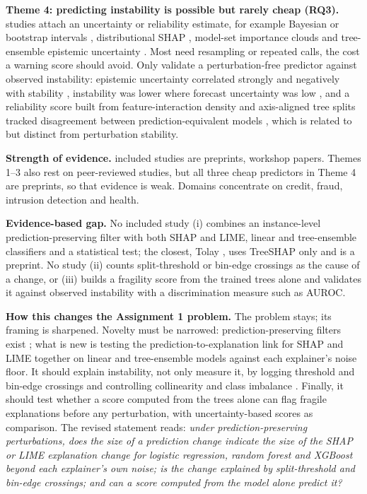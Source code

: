 \textbf{Theme 4: predicting instability is possible but rarely cheap (RQ3).} \mapdiag{} studies attach an uncertainty or reliability estimate, for example Bayesian or bootstrap intervals \cite{S05,S11,S35}, distributional SHAP \cite{S73,S74}, model-set importance clouds \cite{S71} and tree-ensemble epistemic uncertainty \cite{S47}. Most need resampling or repeated calls, the cost a warning score should avoid. Only \mapdiagfree{} validate a perturbation-free predictor against observed instability: epistemic uncertainty correlated strongly and negatively with stability \cite{S52}, instability was lower where forecast uncertainty was low \cite{S77}, and a reliability score built from feature-interaction density and axis-aligned tree splits tracked disagreement between prediction-equivalent models \cite{S75}, which is related to but distinct from perturbation stability.

\textbf{Strength of evidence.} \incPreprint{} included studies are preprints, \incWorkshop{} workshop papers. Themes 1--3 also rest on peer-reviewed studies, but all three cheap predictors in Theme 4 are preprints, so that evidence is weak. Domains concentrate on credit, fraud, intrusion detection and health.

\textbf{Evidence-based gap.} No included study (i) combines an instance-level prediction-preserving filter with both SHAP and LIME, linear and tree-ensemble classifiers and a statistical test; the closest, Tolay \cite{S62}, uses TreeSHAP only and is a preprint. No study (ii) counts split-threshold or bin-edge crossings as the cause of a change, or (iii) builds a fragility score from the trained trees alone and validates it against observed instability with a discrimination measure such as AUROC.

\textbf{How this changes the Assignment 1 problem.} The problem stays; its framing is sharpened. Novelty must be narrowed: prediction-preserving filters exist \cite{S09,S25,S62}; what is new is testing the prediction-to-explanation link for SHAP and LIME together on linear and tree-ensemble models against each explainer's noise floor. It should explain instability, not only measure it, by logging threshold and bin-edge crossings and controlling collinearity and class imbalance \cite{S29,S43,S53}. Finally, it should test whether a score computed from the trees alone can flag fragile explanations before any perturbation, with uncertainty-based scores \cite{S52,S77} as comparison. The revised statement reads: \textit{under prediction-preserving perturbations, does the size of a prediction change indicate the size of the SHAP or LIME explanation change for logistic regression, random forest and XGBoost beyond each explainer's own noise; is the change explained by split-threshold and bin-edge crossings; and can a score computed from the model alone predict it?}

